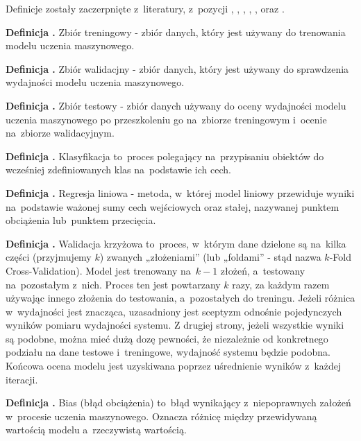 Definicje zostały zaczerpnięte z~literatury, z~pozycji \cite{Fenner2020}, \cite{Geron2020},
\cite{Seenappa} , \cite{Goodfellow2016}, \cite{vanDerMaaten}, \cite{strGoogle} oraz \cite{strIbm}.

\noindent
\textbf{Definicja .}
\incrementdefinitionIndex
Zbiór treningowy - zbiór danych, który jest używany do trenowania modelu uczenia maszynowego.

\noindent
\textbf{Definicja .}
\incrementdefinitionIndex
Zbiór walidacjny - zbiór danych, który jest używany do sprawdzenia wydajności modelu uczenia maszynowego.

\noindent
\textbf{Definicja .}
\incrementdefinitionIndex
Zbiór testowy - zbiór danych używany do oceny wydajności modelu uczenia maszynowego
po przeszkoleniu go na~zbiorze treningowym i~ocenie na~zbiorze walidacyjnym.

\noindent
\textbf{Definicja .}
\incrementdefinitionIndex
Klasyfikacja to~proces polegający na~przypisaniu obiektów do wcześniej zdefiniowanych klas na~podstawie ich cech.

\noindent
\textbf{Definicja .}
\incrementdefinitionIndex
Regresja liniowa - metoda, w~której model liniowy przewiduje wyniki na~podstawie ważonej sumy cech wejściowych oraz stałej,
nazywanej punktem obciążenia lub~punktem przecięcia.

\noindent
\textbf{Definicja .}
\incrementdefinitionIndex
Walidacja krzyżowa to~proces, w~którym dane dzielone są na~kilka części (przyjmujemy $k$) zwanych „złożeniami”
(lub „foldami” - stąd nazwa $k$-Fold Cross-Validation). Model jest trenowany na~$k-1$ złożeń, a~testowany na~pozostałym z~nich.
Proces ten jest powtarzany $k$ razy, za każdym razem używając innego złożenia do testowania, a~pozostałych do treningu.
Jeżeli różnica w~wydajności jest znacząca, uzasadniony jest sceptyzm odnośnie pojedynczych wyników pomiaru wydajności systemu.
Z drugiej strony, jeżeli wszystkie wyniki są podobne, można mieć dużą dozę pewności, że niezależnie od konkretnego podziału
na dane testowe i~treningowe, wydajność systemu będzie podobna.
Końcowa ocena modelu jest uzyskiwana poprzez uśrednienie wyników z~każdej iteracji.

\noindent
\textbf{Definicja .}
\incrementdefinitionIndex
Bias (błąd obciążenia) to~błąd wynikający z~niepoprawnych założeń w~procesie uczenia maszynowego.
Oznacza różnicę między przewidywaną wartością modelu a~rzeczywistą wartością.

